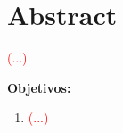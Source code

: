 \section*{Abstract}

\textcolor{red}{(...)}

\textbf{Objetivos:}
\begin{enumerate}
    \item \textcolor{red}{(...)}
\end{enumerate}
